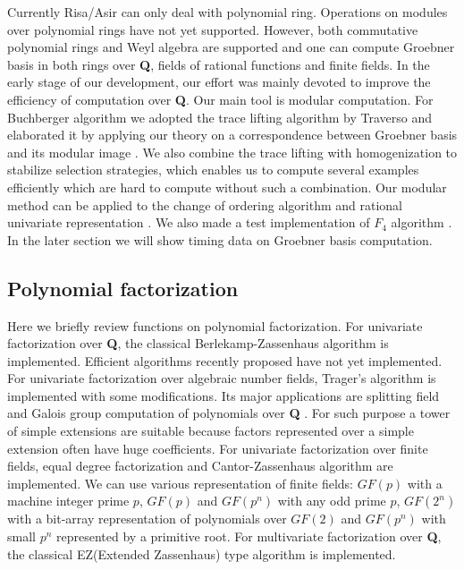 \documentclass[runningheads]{cl2emult}
\begin{document}
Currently Risa/Asir can only deal with polynomial ring. Operations on
modules over polynomial rings have not yet supported.  However, both
commutative polynomial rings and Weyl algebra are supported and one
can compute Groebner basis in both rings over {\bf Q}, fields of
rational functions and finite fields. In the early stage of our
development, our effort was mainly devoted to improve the efficiency
of computation over {\bf Q}. Our main tool is modular
computation. For Buchberger algorithm we adopted the trace lifting
algorithm by Traverso \cite{TRAV} and elaborated it by applying our
theory on a correspondence between Groebner basis and its modular
image \cite{NOYO}. We also combine the trace lifting with
homogenization to stabilize selection strategies, which enables us to
compute several examples efficiently which are hard to compute without
such a combination.  Our modular method can be applied to the change
of ordering algorithm\cite{FGLM} and rational univariate
representation \cite{RUR}.  We also made a test implementation of
$F_4$ algorithm \cite{F4}. In the later section we will show timing
data on Groebner basis computation.

\subsection{Polynomial factorization}

Here we briefly review functions on polynomial factorization.  For
univariate factorization over {\bf Q}, the classical
Berlekamp-Zassenhaus algorithm is implemented.  Efficient algorithms
recently proposed have not yet implemented.  For univariate
factorization over algebraic number fields, Trager's algorithm
\cite{TRAGER} is implemented with some modifications.  Its major
applications are splitting field and Galois group computation of
polynomials over {\bf Q} \cite{ANY}. For such purpose a tower of
simple extensions are suitable because factors represented over a
simple extension often have huge coefficients.  For univariate
factorization over finite fields, equal degree factorization and
Cantor-Zassenhaus algorithm are implemented. We can use various
representation of finite fields: $GF(p)$ with a machine integer prime
$p$, $GF(p)$ and $GF(p^n)$ with any odd prime $p$, $GF(2^n)$ with a
bit-array representation of polynomials over $GF(2)$ and $GF(p^n)$
with small $p^n$ represented by a primitive root.  For multivariate
factorization over {\bf Q}, the classical EZ(Extended
Zassenhaus) type algorithm is implemented.
\end{document}
